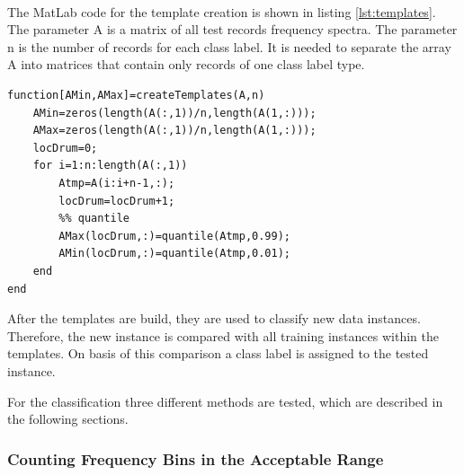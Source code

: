 The MatLab\textsuperscript{\textregistered} code for the template creation is shown in listing \ref{lst:templates}. The parameter A is a matrix of all test records frequency spectra. The parameter n is the number of records for each class label. It is needed to separate the array A into matrices that contain only records of one class label type.

\begin{lstlisting}[caption={Template creation},label={lst:templates}]
function[AMin,AMax]=createTemplates(A,n)
	AMin=zeros(length(A(:,1))/n,length(A(1,:)));
	AMax=zeros(length(A(:,1))/n,length(A(1,:)));
	locDrum=0;
	for i=1:n:length(A(:,1))				
		Atmp=A(i:i+n-1,:);
		locDrum=locDrum+1;				
		%% quantile
		AMax(locDrum,:)=quantile(Atmp,0.99);
		AMin(locDrum,:)=quantile(Atmp,0.01);   
	end
end
\end{lstlisting}

After the templates are build, they are used to classify new data instances. Therefore, the new instance is compared with all training instances within the templates. On basis of this comparison a class label is assigned to the tested instance. 

For the classification three different methods are tested, which are described in the following sections.


\newpage
\subsubsection{Counting Frequency Bins in the Acceptable Range}
\label{section:shapeComparisonClassification1}

